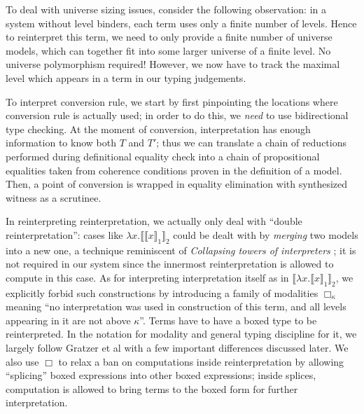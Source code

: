 To deal with universe sizing issues, consider the
following observation: in a system without level
binders, each term uses only a finite number of levels.
Hence to reinterpret this term, we need to only provide
a finite number of universe models, which can together
fit into some larger universe of a finite level. No
universe polymorphism required! However, we now have to
track the maximal level which appears in a term in our
typing judgements.

To interpret conversion rule, we start by first
pinpointing the locations where conversion rule is
actually used; in order to do this, we \textit{need} to
use bidirectional type checking. At the moment of
conversion, interpretation has enough information to
know both $T$ and $T'$; thus we can translate a chain of
reductions performed during definitional equality check
into a chain of propositional equalities taken from
coherence conditions proven in the definition of a
model. Then, a point of conversion is wrapped in
equality elimination with synthesized witness as a
scrutinee.

In reinterpreting reinterpretation, we actually only
deal with ``double reinterpretation'': cases like
$\lambda x.\llbracket\llbracket x\rrbracket_1
\rrbracket_2$ could be dealt with by \textit{merging}
two models into a new one, a technique reminiscent of
\textit{Collapsing towers of interpreters}
\cite{Amin2017}; it is not required in our system since
the innermost reinterpretation is allowed to compute in
this case. As for interpreting interpretation itself as
in $\llbracket\lambda x.\llbracket x \rrbracket_1
\rrbracket_2$, we explicitly forbid such constructions
by introducing a family of modalities $\Box_\kappa$
meaning ``no interpretation was used in construction of
this term, and all levels appearing in it are not above
$\kappa$''. Terms have to have a boxed type to be
reinterpreted. In the notation for modality and general
typing discipline for it, we largely follow Gratzer et
al \cite{Gratzer2019} with a few important differences
discussed later. We also use $\Box$ to relax a ban on
computations inside reinterpretation by allowing
``splicing'' boxed expressions into other boxed
expressions; inside splices, computation is allowed to
bring terms to the boxed form for further
interpretation.

